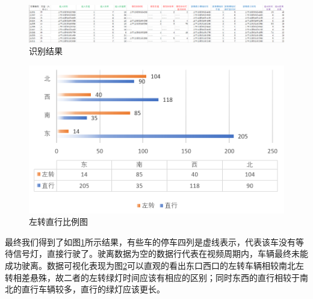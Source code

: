 \begin{figure}[H]
    \centering
    \includegraphics[scale=0.5]{figures/识别结果.png}
    \caption{识别结果}
    \label{fig：识别结果}
\end{figure}

\begin{figure}[H]
    \centering
    \includegraphics[scale=0.5]{figures/左转直行比例图.png}
    \caption{左转直行比例图}
    \label{fig：左转直行比例图}
\end{figure}

最终我们得到了如图\ref{fig：识别结果}所示结果，有些车的停车四列是虚线表示，代表该车没有等待信号灯，直接行驶了。驶离数据为空的数据行代表在视频周期内，车辆最终未能成功驶离。数据可视化表现为图\ref{fig：左转直行比例图}可以直观的看出东口西口的左转车辆相较南北左转相差悬殊，故二者的左转绿灯时间应该有相应的区别；同时东西的直行相较于南北的直行车辆较多，直行的绿灯应该更长。
